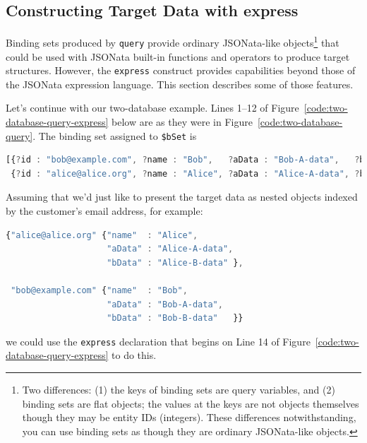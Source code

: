 \documentclass[10pt,letterpaper]{article} %
\newcommand{\stt}[1]{\texttt{#1}} %
\begin{document}
\subsection{Constructing  Target Data with express}

Binding sets produced by \stt{query} provide ordinary JSONata-like objects\footnote{Two differences: (1) the keys of binding sets are query variables, and (2) binding sets are flat objects; the values at the keys are not objects themselves though they may be entity IDs (integers). These differences notwithstanding, you can use binding sets as though they are ordinary JSONata-like objects.} that could be used with JSONata built-in functions and operators to produce target structures.
However, the \stt{express} construct provides capabilities beyond those of the JSONata expression language.
This section describes some of those features.

Let's continue with our two-database example.
Lines 1--12 of Figure~\ref{code:two-database-query-express} below are as they were in Figure~\ref{code:two-database-query}.
The binding set assigned to \stt{\$bSet} is
\begin{lstlisting}[language=JavaScript,numbers=none,basicstyle=\ttfamily\scriptsize]
[{?id : "bob@example.com", ?name : "Bob",   ?aData : "Bob-A-data",   ?bData : "Bob-B-data"  },
 {?id : "alice@alice.org", ?name : "Alice", ?aData : "Alice-A-data", ?bData : "Alice-B-data"}].
\end{lstlisting} \vspace{-2em}

Assuming that we'd just like to present the target data as nested objects indexed by the customer's email address, for example:

\begin{lstlisting}[language=JavaScript,numbers=none,basicstyle=\ttfamily\scriptsize]
{"alice@alice.org" {"name"  : "Alice",
                    "aData" : "Alice-A-data",
                    "bData" : "Alice-B-data" },

 "bob@example.com" {"name"  : "Bob",
                    "aData" : "Bob-A-data",
                    "bData" : "Bob-B-data"   }}
\end{lstlisting} \vspace{-2em}

\hspace{-2em} we could use the \stt{express} declaration that begins on Line 14 of Figure~\ref{code:two-database-query-express} to do this.
\end{document}
